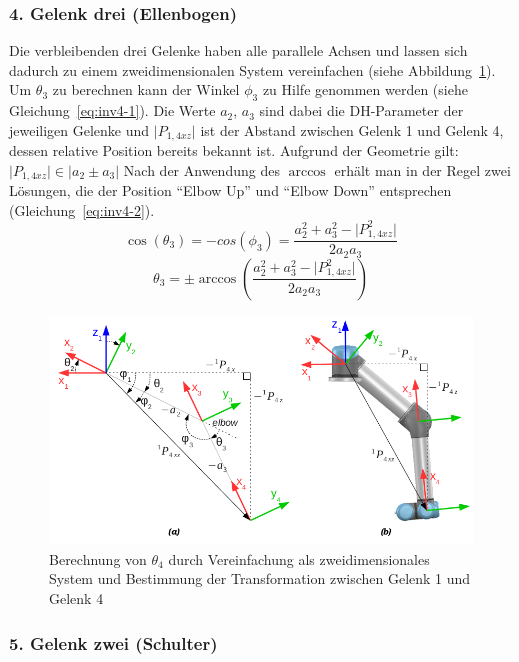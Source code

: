 \subsubsection{4. Gelenk drei (Ellenbogen)}

Die verbleibenden drei Gelenke haben alle parallele Achsen und lassen sich dadurch zu einem zweidimensionalen System vereinfachen (siehe Abbildung~\ref{fig:inv1-4}).
Um $\theta_3$ zu berechnen kann der Winkel $\phi_3$ zu Hilfe genommen werden (siehe Gleichung~\ref{eq:inv4-1}).
Die Werte $a_2$, $a_3$ sind dabei die DH-Parameter der jeweiligen Gelenke und $\lvert P_{1,4xz} \rvert$ ist der Abstand zwischen Gelenk 1 und Gelenk 4, dessen relative Position bereits bekannt ist.
Aufgrund der Geometrie gilt: $\lvert P_{1,4xz} \rvert \in \lvert a_2 \pm a_3 \rvert$
Nach der Anwendung des $\arccos$ erhält man in der Regel zwei Lösungen, die der Position \enquote{Elbow Up} und \enquote{Elbow Down} entsprechen (Gleichung~\ref{eq:inv4-2}).
\begin{equation}
    \cos(\theta_3) = -cos(\phi_3) = \frac{a_2^2 + a_3^2 - \lvert P_{1,4xz}^2 \rvert}{2 a_2 a_3}   \label{eq:inv4-1}
\end{equation}
\begin{equation}
    \theta_3 = \pm \arccos \left(  \frac{a_2^2 + a_3^2 - \lvert P_{1,4xz}^2 \rvert}{2 a_2 a_3} \right)  \label{eq:inv4-2}
\end{equation}
\begin{figure}[h]
    \centering
    \includegraphics[width = .8\textwidth]{Bilder/inv4}
    \caption{Berechnung von $\theta_4$ durch Vereinfachung als zweidimensionales System und Bestimmung der Transformation zwischen Gelenk 1 und Gelenk 4~\cite{rasmusandersenKinematicsUR52018}}\label{fig:inv1-4}
\end{figure}

\subsubsection{5. Gelenk zwei (Schulter)}

